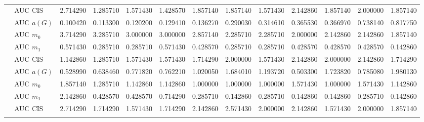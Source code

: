\begin{table}[htbp]
\begin{tabular}{llrrrrrrrrrrr}
    & AUC CIS & 2.714290 & 1.285710 & 1.571430 & 1.428570 & 1.857140 & 1.857140 & 1.571430 & 2.142860 & 1.857140 & 2.000000 & 1.857140 \\
    \addlinespace
    \multirow{4}{*}{degree} & AUC $a(G)$ & 0.100420 & 0.113300 & 0.120200 & 0.129410 & 0.136270 & 0.290030 & 0.314610 & 0.365530 & 0.366970 & 0.738140 & 0.817750 \\
    & AUC $m_0$ & 3.714290 & 3.285710 & 3.000000 & 3.000000 & 2.857140 & 2.285710 & 2.285710 & 2.000000 & 2.142860 & 2.142860 & 1.857140 \\
    & AUC $m_1$ & 0.571430 & 0.285710 & 0.285710 & 0.571430 & 0.428570 & 0.285710 & 0.285710 & 0.428570 & 0.428570 & 0.428570 & 0.142860 \\
    & AUC CIS & 1.142860 & 1.285710 & 1.571430 & 1.571430 & 1.714290 & 2.000000 & 1.571430 & 2.142860 & 2.000000 & 2.142860 & 1.714290 \\
    \addlinespace
    \multirow{4}{*}{random} & AUC $a(G)$ & 0.528990 & 0.638460 & 0.771820 & 0.762210 & 1.020050 & 1.684010 & 1.193720 & 0.503300 & 1.723820 & 0.785080 & 1.980130 \\
    & AUC $m_0$ & 1.857140 & 1.285710 & 1.142860 & 1.142860 & 1.000000 & 1.000000 & 1.000000 & 1.571430 & 1.000000 & 1.571430 & 1.142860 \\
    & AUC $m_1$ & 2.142860 & 0.428570 & 0.428570 & 0.714290 & 0.285710 & 0.142860 & 0.285710 & 0.142860 & 0.142860 & 0.285710 & 0.142860 \\
    & AUC CIS & 2.714290 & 1.714290 & 1.571430 & 1.714290 & 2.142860 & 2.571430 & 2.000000 & 2.142860 & 1.571430 & 2.000000 & 1.857140 \\
    \addlinespace
    \bottomrule
  \end{tabular}
\end{table}


